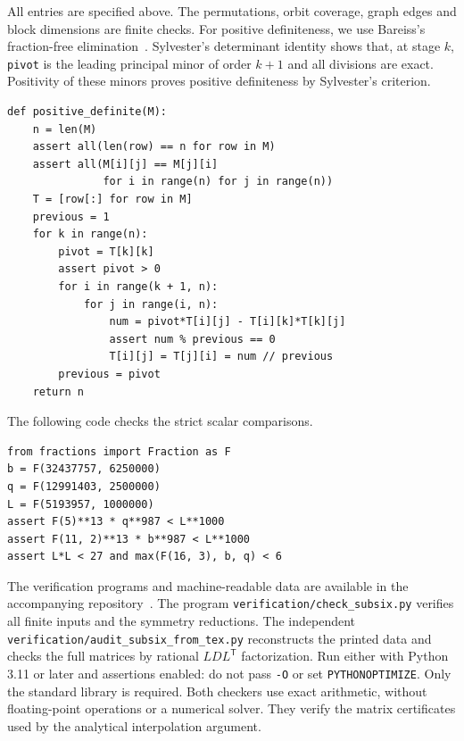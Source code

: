 All entries are specified above. The permutations, orbit coverage,
graph edges and block dimensions are finite checks. For positive
definiteness, we use Bareiss's fraction-free elimination~\cite{Bareiss}.
Sylvester's determinant identity shows that, at stage $k$,
\texttt{pivot} is the leading principal minor of order $k+1$ and all
divisions are exact. Positivity of these minors proves positive
definiteness by Sylvester's criterion.
\begin{Verbatim}[fontsize=\footnotesize,baselinestretch=.96]
def positive_definite(M):
    n = len(M)
    assert all(len(row) == n for row in M)
    assert all(M[i][j] == M[j][i]
               for i in range(n) for j in range(n))
    T = [row[:] for row in M]
    previous = 1
    for k in range(n):
        pivot = T[k][k]
        assert pivot > 0
        for i in range(k + 1, n):
            for j in range(i, n):
                num = pivot*T[i][j] - T[i][k]*T[k][j]
                assert num % previous == 0
                T[i][j] = T[j][i] = num // previous
        previous = pivot
    return n
\end{Verbatim}
The following code checks the strict scalar comparisons.
\begin{Verbatim}[fontsize=\footnotesize,baselinestretch=.96]
from fractions import Fraction as F
b = F(32437757, 6250000)
q = F(12991403, 2500000)
L = F(5193957, 1000000)
assert F(5)**13 * q**987 < L**1000
assert F(11, 2)**13 * b**987 < L**1000
assert L*L < 27 and max(F(16, 3), b, q) < 6
\end{Verbatim}
The verification programs and machine-readable data are available in
the accompanying repository~\cite{ZeissData}.
The program \nolinkurl{verification/check_subsix.py} verifies all finite
inputs and the symmetry reductions. The independent
\nolinkurl{verification/audit_subsix_from_tex.py} reconstructs the printed
data and checks the full matrices by rational $LDL^{\mathsf T}$
factorization. Run either with Python 3.11 or later and assertions enabled:
do not pass \texttt{-O} or set \texttt{PYTHONOPTIMIZE}. Only the standard
library is required. Both checkers use exact arithmetic, without floating-point
operations or a numerical solver. They verify the matrix certificates
used by the analytical interpolation argument.


